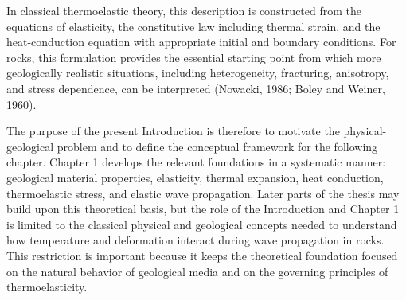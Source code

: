 \documentclass[12pt]{article}
\begin{document}
In classical thermoelastic theory, this description is constructed from the equations of elasticity, the constitutive law including thermal strain, and the heat-conduction equation with appropriate initial and boundary conditions. For rocks, this formulation provides the essential starting point from which more geologically realistic situations, including heterogeneity, fracturing, anisotropy, and stress dependence, can be interpreted (Nowacki, 1986; Boley and Weiner, 1960).

The purpose of the present Introduction is therefore to motivate the physical-geological problem and to define the conceptual framework for the following chapter. Chapter 1 develops the relevant foundations in a systematic manner: geological material properties, elasticity, thermal expansion, heat conduction, thermoelastic stress, and elastic wave propagation. Later parts of the thesis may build upon this theoretical basis, but the role of the Introduction and Chapter 1 is limited to the classical physical and geological concepts needed to understand how temperature and deformation interact during wave propagation in rocks. This restriction is important because it keeps the theoretical foundation focused on the natural behavior of geological media and on the governing principles of thermoelasticity.
\end{document}
